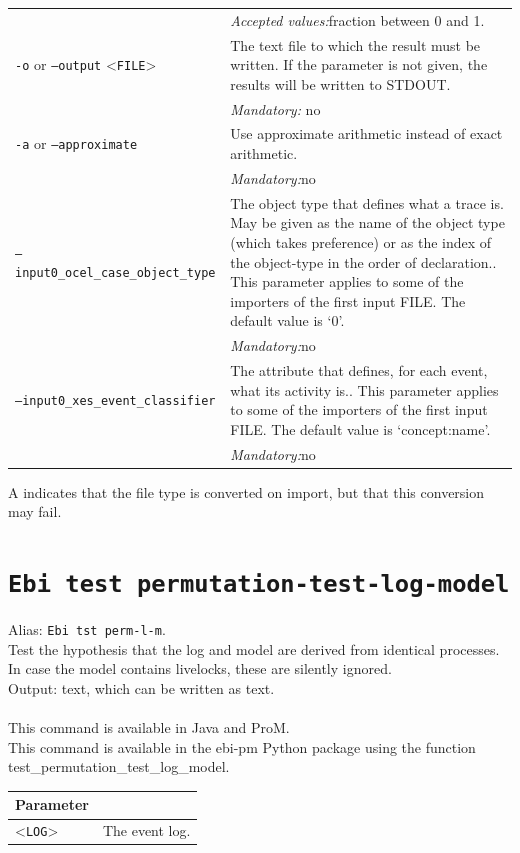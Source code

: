 {\begin{tabularx}{\linewidth}{lX}
&\textit{Accepted values:}\quad fraction between 0 and 1.\\
\texttt{-o} or \texttt{--output} <\texttt{FILE}> &
The text file to which the result must be written. If the parameter is not given, the results will be written to STDOUT.\\
&\textit{Mandatory:} \quad no\\
\texttt{-a} or \texttt{--approximate} & Use approximate arithmetic instead of exact arithmetic.\\
&\textit{Mandatory:}\quad no\\
\texttt{--input0\_ocel\_case\_object\_type} & The object type that defines what a trace is. May be given as the name of the object type (which takes preference) or as the index of the object-type in the order of declaration.. This parameter applies to some of the importers of the first input FILE. The default value is `0'.\\
&\textit{Mandatory:}\quad no\\
\texttt{--input0\_xes\_event\_classifier} & The attribute that defines, for each event, what its activity is.. This parameter applies to some of the importers of the first input FILE. The default value is `concept:name'.\\
&\textit{Mandatory:}\quad no\\
\bottomrule
\end{tabularx}
A \textdagger{} indicates that the file type is converted on import, but that this conversion may fail.
\clearpage\section{\texttt{Ebi test permutation-test-log-model}}
\label{command:Ebi test permutation-test-log-model}
Alias: \texttt{Ebi tst perm-l-m}.\\
Test the hypothesis that the log and model are derived from identical processes. In case the model contains livelocks, these are silently ignored.\\
\noindent Output: text, which can be written as  text.\\
\\This command is available in Java and ProM.
\\This command is available in the ebi-pm Python package using the function test\_permutation\_test\_log\_model.
\begin{tabularx}{\linewidth}{lX}
\toprule
Parameter \\\midrule
<\texttt{LOG}>&The event log.\\

\end{tabularx}}
